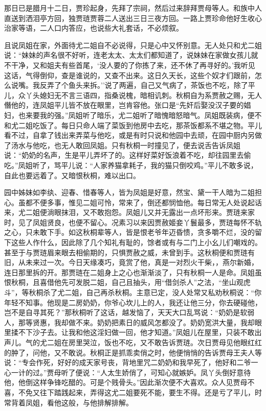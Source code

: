 那日已是腊月十二日，贾珍起身，先拜了宗祠，然后过来辞拜贾母等人。和族中人直送到洒泪亭方回，独贾琏贾蓉二人送出三日三夜方回。一路上贾珍命他好生收心治家等语，二人口内答应，也说些大礼套话，不必烦叙。

且说凤姐在家，外面待尤二姐自不必说得，只是心中又怀别意。无人处只和尤二姐说：``妹妹的声名很不好听，连老太太、太太们都知道了，说妹妹在家做女孩儿就不干净，又和姐夫有些首尾，`没人要的了你拣了来，还不休了再寻好的。'我听见这话，气得倒仰，查是谁说的，又查不出来。这日久天长，这些个奴才们跟前，怎么说嘴。我反弄了个鱼头来拆。''说了两遍，自己又气病了，茶饭也不吃，除了平儿，众丫头媳妇无不言三语四，指桑说槐，暗相讥刺。秋桐自为系贾赦之赐，无人僭他的，连凤姐平儿皆不放在眼里，岂肯容他。张口是``先奸后娶没汉子要的娼妇，也来要我的强。''凤姐听了暗乐，尤二姐听了暗愧暗怒暗气。凤姐既装病，便不和尤二姐吃饭了。每日只命人端了菜饭到他房中去吃，那茶饭都系不堪之物。平儿看不过，自拿了钱出来弄菜与他吃，或是有时只说和他园中去顽，在园中厨内另做了汤水与他吃，也无人敢回凤姐。只有秋桐一时撞见了，便去说舌告诉凤姐说：``奶奶的名声，生是平儿弄坏了的。这样好菜好饭浪着不吃，却往园里去偷吃。''凤姐听了，骂平儿说：``人家养猫拿耗子，我的猫只倒咬鸡。''平儿不敢多说，自此也要远着了。又暗恨秋桐，难以出口。

园中姊妹如李纨、迎春、惜春等人，皆为凤姐是好意，然宝、黛一干人暗为二姐担心。虽都不便多事，惟见二姐可怜，常来了，倒还都悯恤他。每日常无人处说起话来，尤二姐便淌眼抹泪，又不敢抱怨。凤姐儿又并无露出一点坏形来。贾琏来家时，见了凤姐贤良，也便不留心。况素习以来因贾赦姬妾丫鬟最多，贾琏每怀不轨之心，只未敢下手。如这秋桐辈等人，皆是恨老爷年迈昏愦，贪多嚼不烂，没的留下这些人作什么，因此除了几个知礼有耻的，馀者或有与二门上小幺儿们嘲戏的。甚至于与贾琏眉来眼去相偷期的，只惧贾赦之威，未曾到手。这秋桐便和贾琏有旧，从未来过一次。今日天缘凑巧，竟赏了他，真是一对烈火干柴，，燕尔新婚，连日那里拆的开。那贾琏在二姐身上之心也渐渐淡了，只有秋桐一人是命。凤姐虽恨秋桐，且喜借他先可发脱二姐，自己且抽头，用``借剑杀人''之法，``坐山观虎斗''，等秋桐杀了尤二姐，自己再杀秋桐。主意已定，没人处常又私劝秋桐说：``你年轻不知事。他现是二房奶奶，你爷心坎儿上的人，我还让他三分，你去硬碰他，岂不是自寻其死？''那秋桐听了这话，越发恼了，天天大口乱骂说：``奶奶是软弱人，那等贤惠，我却做不来。奶奶把素日的威风怎都没了。奶奶宽洪大量，我却眼里揉不下沙子去。让我和他这淫妇做一回，他才知道。''凤姐儿在屋里，只装不敢出声儿。气的尤二姐在房里哭泣，饭也不吃，又不敢告诉贾琏。次日贾母见他眼红红的肿了，问他，又不敢说。秋桐正是抓乖卖俏之时，他便悄悄的告诉贾母王夫人等说：``专会作死，好好的成天家号丧，背地里咒二奶奶和我早死了，他好和二爷一心一计的过。''贾母听了便说：``人太生娇俏了，可知心就嫉妒。凤丫头倒好意待他，他倒这样争锋吃醋的。可是个贱骨头。''因此渐次便不大喜欢。众人见贾母不喜，不免又往下踏践起来，弄得这尤二姐要死不能，要生不得。还是亏了平儿，时常背着凤姐，看他这般，与他排解排解。

